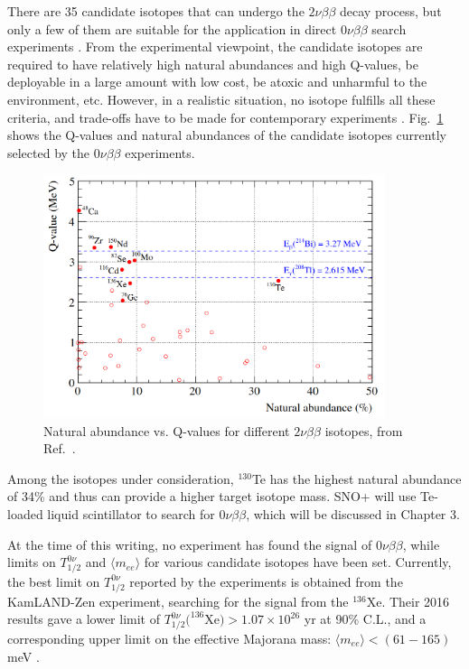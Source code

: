 There are 35 candidate isotopes that can undergo the $2\nu\beta\beta$ decay process, but only a few of them are suitable for the application in direct $0\nu\beta\beta$ search experiments \cite{giunti2007fundamentals}. From the experimental viewpoint, the candidate isotopes are required to have relatively high natural abundances and high Q-values, be deployable in a large amount with low cost, be atoxic and unharmful to the environment, etc. However, in a realistic situation, no isotope fulfills all these criteria, and trade-offs have to be made for contemporary experiments \cite{dolinski2019neutrinoless}. Fig.~\ref{fig:te_abundance} shows the Q-values and natural abundances of the candidate isotopes currently selected by the $0\nu\beta\beta$ experiments.

\begin{figure}[!htb]
	\centering
	\includegraphics[width=10cm]{Te_abundance.png}
	\caption[Natural abundance vs. Q-values for different $2\nu\beta\beta$ isotopes.]{Natural abundance vs. Q-values for different $2\nu\beta\beta$ isotopes, from Ref.~\cite{snop_jinst}.\label{fig:te_abundance}}
\end{figure}

Among the isotopes under consideration, $^{130}$Te has the highest natural abundance of 34\% and thus can provide a higher target isotope mass. SNO+ will use Te-loaded liquid scintillator to search for $0\nu\beta\beta$, which will be discussed in Chapter 3. 

At the time of this writing, no experiment has found the signal of $0\nu\beta\beta$, while limits on $T^{0\nu}_{1/2}$ and $\langle m_{ee}\rangle$ for various candidate isotopes have been set. Currently, the best limit on $T^{0\nu}_{1/2}$ reported by the experiments is obtained from the KamLAND-Zen experiment, searching for the signal from the $^{136}$Xe. Their 2016 results gave a lower limit of $T^{0\nu}_{1/2}(^{136}$Xe$)>1.07\times 10^{26}$ yr at 90\% C.L., and a corresponding upper limit on the effective Majorana mass: $\langle m_{ee}\rangle<(61-165)$ meV \cite{gando2016search}. 

